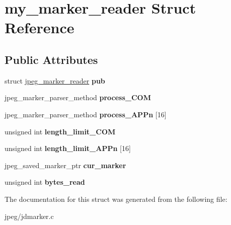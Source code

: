 \hypertarget{structmy__marker__reader}{}\section{my\+\_\+marker\+\_\+reader Struct Reference}
\label{structmy__marker__reader}
\subsection*{Public Attributes}
\begin{DoxyCompactItemize}
\item 
struct \hyperlink{structjpeg__marker__reader}{jpeg\+\_\+marker\+\_\+reader} {\bfseries pub}\hypertarget{structmy__marker__reader_ac0d8a24c85575d304ef4383e8f6ca5fc}{}\label{structmy__marker__reader_ac0d8a24c85575d304ef4383e8f6ca5fc}

\item 
jpeg\+\_\+marker\+\_\+parser\+\_\+method {\bfseries process\+\_\+\+C\+OM}\hypertarget{structmy__marker__reader_a5e10e69e117d23840f04d54e7a3cdde5}{}\label{structmy__marker__reader_a5e10e69e117d23840f04d54e7a3cdde5}

\item 
jpeg\+\_\+marker\+\_\+parser\+\_\+method {\bfseries process\+\_\+\+A\+P\+Pn} \mbox{[}16\mbox{]}\hypertarget{structmy__marker__reader_a3a466da71db30199ab019a03960013cc}{}\label{structmy__marker__reader_a3a466da71db30199ab019a03960013cc}

\item 
unsigned int {\bfseries length\+\_\+limit\+\_\+\+C\+OM}\hypertarget{structmy__marker__reader_aa17938db027aceb539d880b78841826e}{}\label{structmy__marker__reader_aa17938db027aceb539d880b78841826e}

\item 
unsigned int {\bfseries length\+\_\+limit\+\_\+\+A\+P\+Pn} \mbox{[}16\mbox{]}\hypertarget{structmy__marker__reader_a029e9f21bc02a21c1a26d3c0d7158098}{}\label{structmy__marker__reader_a029e9f21bc02a21c1a26d3c0d7158098}

\item 
jpeg\+\_\+saved\+\_\+marker\+\_\+ptr {\bfseries cur\+\_\+marker}\hypertarget{structmy__marker__reader_a861ef3029e1690b4345a8ceb3975e8df}{}\label{structmy__marker__reader_a861ef3029e1690b4345a8ceb3975e8df}

\item 
unsigned int {\bfseries bytes\+\_\+read}\hypertarget{structmy__marker__reader_ada1054ee3408bbfcacdddb27af8d9754}{}\label{structmy__marker__reader_ada1054ee3408bbfcacdddb27af8d9754}

\end{DoxyCompactItemize}


The documentation for this struct was generated from the following file\+:\begin{DoxyCompactItemize}
\item 
jpeg/jdmarker.\+c\end{DoxyCompactItemize}
